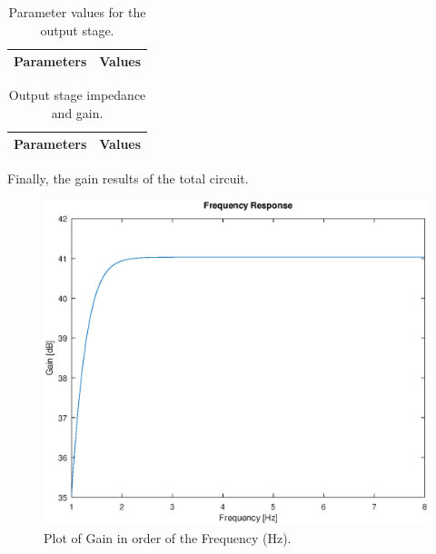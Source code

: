 \begin{table}[h]
  \centering
  \begin{tabular}{|l|r|}
    \hline    
    {\bf Parameters} & {\bf Values} \\ \hline
    
  \end{tabular}
  \caption{Parameter values for the output stage.}
  \label{tab:4}
\end{table}


\begin{table}[h]
  \centering
  \begin{tabular}{|l|r|}
    \hline    
    {\bf Parameters} & {\bf Values} \\ \hline
    
  \end{tabular}
  \caption{Output stage impedance and gain.}
  \label{tab:5}
\end{table}

\vspace{100.0cm}

\par Finally, the gain results of the total circuit.

\begin{figure}[h] \centering
\includegraphics[width=0.6\linewidth]{freqresponse.eps}
\caption{Plot of Gain in order of the Frequency (Hz).}
\label{fig:plotA1}
\end{figure}
